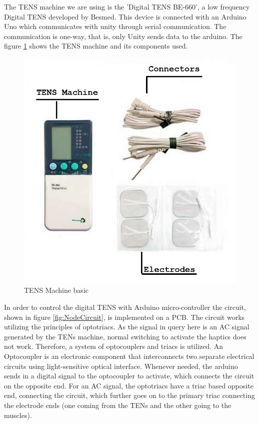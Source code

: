 The TENS machine we are using is the 'Digital TENS BE-660', a low frequency Digital TENS developed by Besmed. This device is connected with an Arduino Uno which communicates with unity through serial communication. The communication is one-way, that is, only Unity sends data to the arduino. The figure \ref{fig:besmed} shows the TENS machine and its components used.

\begin{figure}
    \centering
    \includegraphics[scale=.5]{images/haptics/Besmed1.jpg}
    \caption{TENS Machine basic}
    \label{fig:besmed}
\end{figure}

In order to control the digital TENS with Arduino micro-controller the circuit, shown in figure \ref{fig:NodeCircuit}, is implemented on a PCB. The circuit works utilizing the principles of optotriacs. As the signal in query here is an AC signal generated by the TENs machine, normal switching to activate the haptics does not work. Therefore, a system of optocouplers and triacs is utilized. An Optocoupler is an electronic component that interconnects two separate electrical circuits using light-sensitive optical interface. Whenever needed, the arduino sends in a digital signal to the optocoupler to activate, which connects the circuit on the opposite end. For an AC signal, the optotriacs have a triac based opposite end, connecting the circuit, which further goes on to the primary triac connecting the electrode ends (one coming from the TENs and the other going to the muscles).

